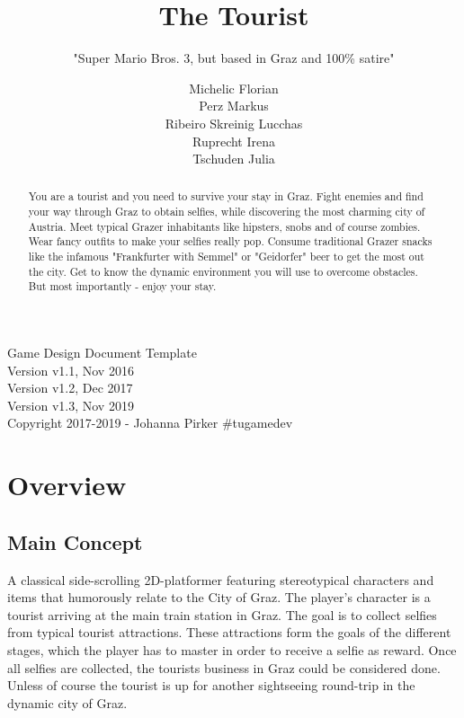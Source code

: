 \documentclass[a4paper]{scrreprt}
\title{The Tourist}
\subtitle{"Super Mario Bros. 3, but based in Graz and 100\% satire"}
\author{Michelic Florian \\ Perz Markus \\ Ribeiro Skreinig Lucchas\\ Ruprecht Irena \\ Tschuden Julia}
\begin{document}
\maketitle

\null\vfill
\noindent
Game Design Document Template\\ 
Version v1.1, Nov 2016\\
Version v1.2, Dec 2017\\
Version v1.3, Nov 2019\\
Copyright 2017-2019 - Johanna Pirker \#tugamedev\\
\newpage

\begin{abstract}
\noindent You are a tourist and you need to survive your stay in Graz. Fight enemies and find your way through Graz to obtain selfies, while discovering the most charming city of Austria.
Meet typical Grazer inhabitants like hipsters, snobs and of course zombies. 
Wear fancy outfits to make your selfies really pop. Consume traditional Grazer snacks like the infamous "Frankfurter with Semmel" or "Geidorfer" beer to get the most out the city. Get to know the dynamic environment you will use to overcome obstacles. But most importantly - enjoy your stay.
\newline

\end{abstract}

\tableofcontents

\chapter{Overview}

\section{Main Concept}
A classical side-scrolling 2D-platformer featuring stereotypical characters and items that humorously relate to the City of Graz. The player's character is a tourist arriving at the main train station in Graz. The goal is to collect selfies from typical tourist attractions. These attractions form the goals of the different stages, which the player has to master in order to receive a selfie as reward.
Once all selfies are collected, the tourists business in Graz could be considered done. Unless of course the tourist is up for another sightseeing round-trip in the dynamic city of Graz. 
\end{document}
